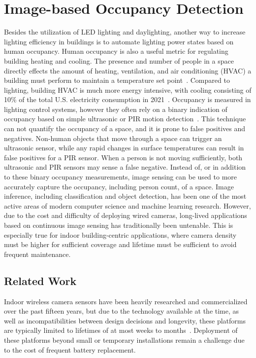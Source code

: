 \section{Image-based Occupancy Detection}
Besides the utilization of LED lighting and daylighting, another way to increase lighting efficiency in buildings is to automate lighting power states based on human occupancy.
Human occupancy is also a useful metric for regulating building heating and cooling.
The presence and number of people in a space directly effects the amount of heating, ventilation, and air conditioning (HVAC) a building must perform to maintain a temperature set point~\cite{wei2020deep}.
Compared to lighting, building HVAC is much more energy intensive, with cooling consisting of 10\% of the total U.S. electricity consumption in 2021~\cite{aeo2022}. 
Occupancy is measured in lighting control systems, however they often rely on a binary indication of occupancy based on simple ultrasonic or PIR motion detection~\cite{levitonDecora}.
This technique can not quantify the occupancy of a space, and it is prone to false positives and negatives.
Non-human objects that move through a space can trigger an ultrasonic sensor, while any rapid changes in surface temperatures can result in false positives for a PIR sensor.
When a person is not moving sufficiently, both ultrasonic and PIR sensors may sense a false negative.
Instead of, or in addition to these binary occupancy measurements, image sensing can be used to more accurately capture the occupancy, including person count, of a space.
Image inference, including classification and object detection, has been one of the most active areas of modern computer science and machine learning research. 
However, due to the cost and difficulty of deploying wired cameras, long-lived applications based on continuous image sensing has traditionally been untenable.
This is especially true for indoor building-centric applications, where camera density must be higher for sufficient coverage and lifetime must be sufficient to avoid frequent maintenance.

\subsection{Related Work}
Indoor wireless camera sensors have been heavily researched and commercialized over the past fifteen years, but due to the technology available at the time, as well as incompatibilities between design decisions and longevity, these platforms are typically limited to lifetimes of at most weeks to months~\cite{rowe2007firefly,rahimi2005cyclops,blinkindoor,wyzeoutdoor,josephson2019wireless}. 
Deployment of these platforms beyond small or temporary installations remain a challenge due to the cost of frequent battery replacement.

